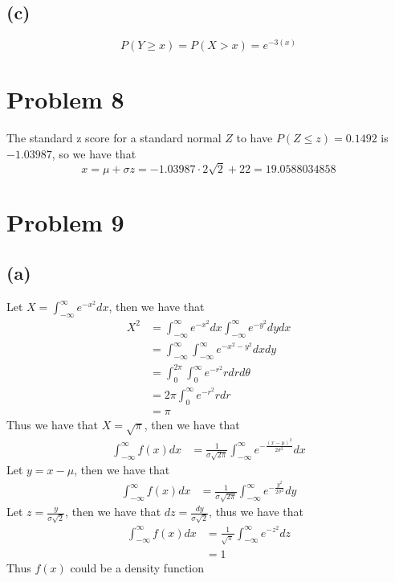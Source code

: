 \subsection*{(c)}
$$P(Y\geq x)=P(X> x)=\boxed{e^{-3(x)}}$$
\section*{Problem 8}
The standard z score for a standard normal $Z$ to have 
$P(Z\leq z)=0.1492$ is $-1.03987$, so we have that
$$x=\mu+\sigma z=-1.03987\cdot2\sqrt{2}+22=\boxed{19.0588034858}$$
\section*{Problem 9}
\subsection*{(a)}
Let $X=\int_{-\infty}^{\infty}e^{-x^2}dx$, then we have that
\begin{align*}
    X^2&=\int_{-\infty}^{\infty}e^{-x^2}dx\int_{-\infty}^{\infty}e^{-y^2}dydx\\
    &=\int_{-\infty}^{\infty}\int_{-\infty}^{\infty}e^{-x^2-y^2}dxdy\\
    &=\int_{0}^{2\pi}\int_{0}^{\infty}e^{-r^2}rdrd\theta\\
    &=2\pi\int_{0}^{\infty}e^{-r^2}rdr\\
    &=\pi
\end{align*}
Thus we have that $X=\sqrt{\pi}$, then we have that 
\begin{align}
    \int_{-\infty}^{\infty}f(x)dx&=\frac{1}{\sigma\sqrt{2\pi}}\int_{-\infty}^{\infty}e^{-\frac{(x-\mu)^2}{2\sigma^2}}dx
\end{align}
Let $y=x-\mu$, then we have that
\begin{align*}
    \int_{-\infty}^{\infty}f(x)dx&=\frac{1}{\sigma\sqrt{2\pi}}\int_{-\infty}^{\infty}e^{-\frac{y^2}{2\sigma^2}}dy
\end{align*}
Let $z=\frac{y}{\sigma\sqrt{2}}$, then we have that $dz=\frac{dy}{\sigma\sqrt{2}}$,
thus we have that 
\begin{align*}
    \int_{-\infty}^{\infty}f(x)dx&=\frac{1}{\sqrt{\pi}}\int_{-\infty}^{\infty}e^{-z^2}dz\\
    &=1
\end{align*}
Thus $f(x)$ could be a density function
